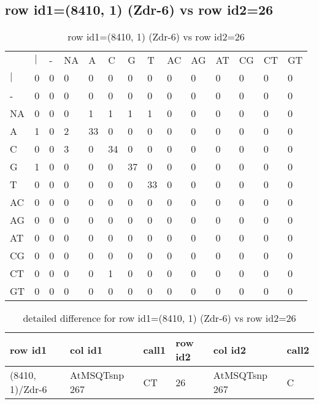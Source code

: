\subsection{row id1=(8410, 1) (Zdr-6) vs row id2=26}
\begin{center}
\begin{longtable}{|l|l|l|l|l|l|l|l|l|l|l|l|l|l|}
\caption{row id1=(8410, 1) (Zdr-6) vs row id2=26} \label{table_dm480}\\
\hline
\\
\hline
&$|$&-&NA&A&C&G&T&AC&AG&AT&CG&CT&GT\\
$|$&0&0&0&0&0&0&0&0&0&0&0&0&0\\
-&0&0&0&0&0&0&0&0&0&0&0&0&0\\
NA&0&0&0&1&1&1&1&0&0&0&0&0&0\\
A&1&0&2&33&0&0&0&0&0&0&0&0&0\\
C&0&0&3&0&34&0&0&0&0&0&0&0&0\\
G&1&0&0&0&0&37&0&0&0&0&0&0&0\\
T&0&0&0&0&0&0&33&0&0&0&0&0&0\\
AC&0&0&0&0&0&0&0&0&0&0&0&0&0\\
AG&0&0&0&0&0&0&0&0&0&0&0&0&0\\
AT&0&0&0&0&0&0&0&0&0&0&0&0&0\\
CG&0&0&0&0&0&0&0&0&0&0&0&0&0\\
CT&0&0&0&0&1&0&0&0&0&0&0&0&0\\
GT&0&0&0&0&0&0&0&0&0&0&0&0&0\\
\hline
\end{longtable}
\end{center}

\begin{center}
\begin{longtable}{|l|l|l|l|l|l|}
\caption{detailed difference for row id1=(8410, 1) (Zdr-6) vs row id2=26} \label{table_dm481}\\
\hline
row id1&col id1&call1&row id2&col id2&call2\\
\hline
(8410, 1)/Zdr-6&AtMSQTsnp 267&CT&26&AtMSQTsnp 267&C\\
\hline
\end{longtable}
\end{center}

